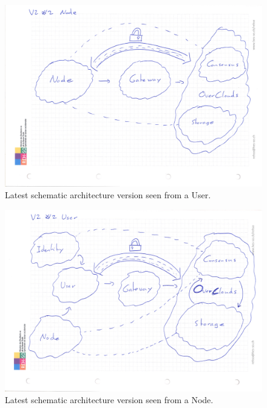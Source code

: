 \begin{figure}[htpb]
\centering
\caption{Latest schematic architecture version seen from a User.
\label{fig:latest-schematic-architecture-user}} 
\begin{adjustbox}{center}
\includegraphics[scale=0.18]{annexes/concepts/Architecture-Draft-global-view-idea-2-node.jpeg}
\end{adjustbox} 
\end{figure}

\begin{figure}[htpb]
\centering
\caption{Latest schematic architecture version seen from a Node.
\label{fig:latest-schematic-architecture-node}} 
\begin{adjustbox}{center}
\includegraphics[scale=0.18]{annexes/concepts/Architecture-Draft-global-view-idea-2.jpeg}
\end{adjustbox} 
\end{figure}


